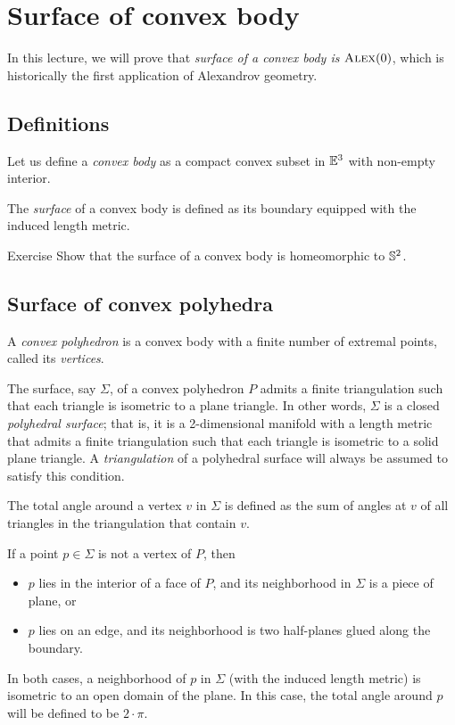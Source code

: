 \chapter{Surface of convex body}\label{chap:convex-body}

In this lecture, we will prove that \textit{surface of a convex body is $\textsc{Alex}(0)$},
which is historically the first application of Alexandrov geometry.

\section{Definitions}

Let us define a \emph{convex body} as a compact convex subset in $\mathbb{E}^3$ with non-empty interior.

The \emph{surface} of a convex body is defined as its boundary equipped with the induced length metric.

\begin{thm}{Exercise}\label{ex:surf-S2}
Show that the surface of a convex body is homeomorphic to $\mathbb{S}^2$.
\end{thm}

\section{Surface of convex polyhedra}

A \emph{convex polyhedron} is a convex body with a finite number of extremal points, called its \emph{vertices}.

The surface, say $\Sigma$, of a convex polyhedron $P$ admits a finite triangulation such that each triangle is isometric to a plane triangle.
In other words, $\Sigma$ is a closed \emph{polyhedral surface};
that is, it is a 2-dimensional manifold with a length metric that admits a finite triangulation such that each triangle is isometric to a solid plane triangle.
A \emph{triangulation} of a polyhedral surface will always be assumed to satisfy this condition.

The total angle around a vertex $v$ in $\Sigma$ is defined as the sum of angles at $v$ of all triangles in the triangulation that contain $v$.

If a point $p\in \Sigma$ is not a vertex of $P$,
then
\begin{itemize}
\item $p$ lies in the interior of a face of $P$, and its neighborhood in $\Sigma$ is a piece of plane, or
\item $p$ lies on an edge, and its neighborhood is two half-planes glued along the boundary.
\end{itemize}
In both cases, a neighborhood of $p$ in $\Sigma$ (with the induced length metric) is isometric to an open domain of the plane.
In this case, the total angle around $p$ will be defined to be $2\cdot\pi$.

